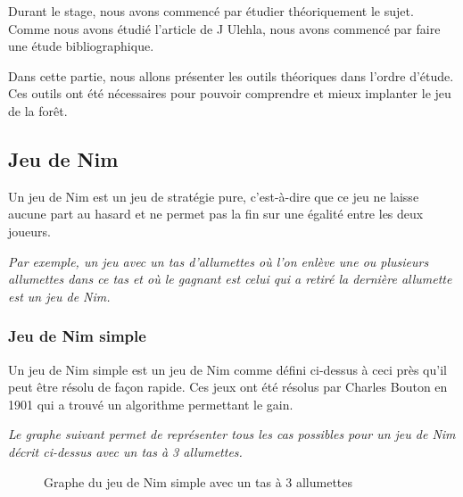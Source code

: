 Durant le stage, nous avons commencé par étudier théoriquement le sujet. Comme nous avons étudié l'article de J Ulehla, nous avons commencé par faire une étude bibliographique.

Dans cette partie, nous allons présenter les outils théoriques dans l'ordre d’étude. Ces outils ont été nécessaires pour pouvoir comprendre et mieux implanter le jeu de la forêt.

\subsection{Jeu de Nim}
\label{sub:Jeu de Nim}
  Un jeu de  Nim est un jeu de stratégie pure, c'est-à-dire que ce jeu ne laisse aucune part au hasard et ne permet pas la fin sur une égalité entre les deux joueurs.

  \textit{
    Par exemple, un jeu avec un tas d'allumettes où l'on enlève une ou plusieurs allumettes dans ce tas et où le gagnant est celui qui a retiré la dernière allumette est un jeu de Nim.
  }
  \subsubsection{Jeu de Nim simple}
  \label{subsub: Jeu de Nim simple}
    Un jeu de Nim simple est un jeu de Nim comme défini ci-dessus à ceci près qu'il peut être résolu de façon rapide. Ces jeux ont été résolus par Charles Bouton en 1901\cite{jfji} qui a trouvé un algorithme permettant le gain.

    \textit{
      Le graphe suivant permet de représenter tous les cas possibles pour un jeu de Nim décrit ci-dessus avec un tas à 3 allumettes.
    }
    \begin{figure}[h]
      \centering
      \caption{Graphe du jeu de Nim simple avec un tas à 3 allumettes}
    \end{figure}

